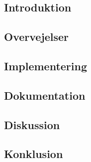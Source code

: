 \documentclass[../main.tex]{subfiles}
\begin{document}
\subsection{Introduktion}


\subsection{Overvejelser}


\subsection{Implementering}


\subsection{Dokumentation}


\subsection{Diskussion}


\subsection{Konklusion}
\end{document}
